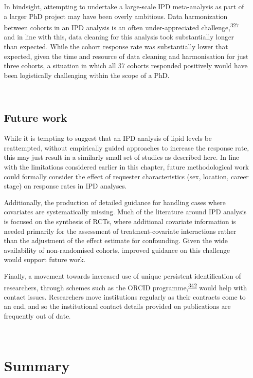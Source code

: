 \documentclass[a4paper, twoside]{templates/ociamthesis}
\begin{document}
In hindsight, attempting to undertake a large-scale IPD meta-analysis as part of a larger PhD project may have been overly ambitious. Data harmonization between cohorts in an IPD analysis is an often under-appreciated challenge,\textsuperscript{\protect\hyperlink{ref-levis2021}{327}} and in line with this, data cleaning for this analysis took substantially longer than expected. While the cohort response rate was substantially lower that expected, given the time and resource of data cleaning and harmonisation for just three cohorts, a situation in which all 37 cohorts responded positively would have been logistically challenging within the scope of a PhD.

~

\hypertarget{future-work}{%
\subsection{Future work}\label{future-work}}

While it is tempting to suggest that an IPD analysis of lipid levels be reattempted, without empirically guided approaches to increase the response rate, this may just result in a similarly small set of studies as described here. In line with the limitations considered earlier in this chapter, future methodological work could formally consider the effect of requester characteristics (sex, location, career stage) on response rates in IPD analyses.

Additionally, the production of detailed guidance for handling cases where covariates are systematically missing. Much of the literature around IPD analysis is focused on the synthesis of RCTs, where additional covariate information is needed primarily for the assessment of treatment-covariate interactions rather than the adjustment of the effect estimate for confounding. Given the wide availability of non-randomised cohorts, improved guidance on this challenge would support future work.

Finally, a movement towards increased use of unique persistent identification of researchers, through schemes such as the ORCID programme,\textsuperscript{\protect\hyperlink{ref-nature2009}{342}} would help with contact issues. Researchers move institutions regularly as their contracts come to an end, and so the institutional contact details provided on publications are frequently out of date.

~

\hypertarget{summary-5}{%
\section{Summary}\label{summary-5}}
\end{document}
